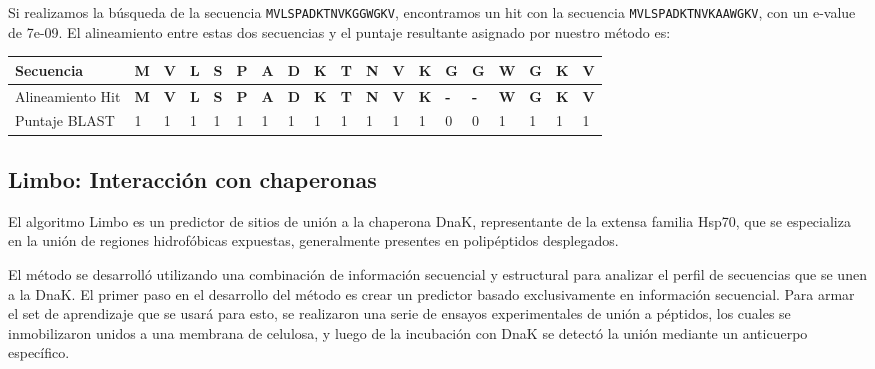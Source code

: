 Si realizamos la búsqueda de la secuencia \texttt{MVLSPADKTNVKGGWGKV}, encontramos un hit con la secuencia \texttt{MVLSPADKTNVKAAWGKV}, con un e-value de 7e-09. 
El alineamiento entre estas dos secuencias y el puntaje resultante asignado por nuestro método es:
\vspace{0.5cm}

\noindent
\begin{tabular}{lllllllllllllllllll} 
\hline
Secuencia 		& \textbf{M} & \textbf{V} & \textbf{L} & \textbf{S} & \textbf{P} & \textbf{A} & \textbf{D} & \textbf{K} & \textbf{T} & \textbf{N} & \textbf{V} & \textbf{K} & \textbf{G} & \textbf{G} & \textbf{W} & \textbf{G} & \textbf{K} & \textbf{V}\\ \hline
Alineamiento Hit	& \textbf{M} & \textbf{V} & \textbf{L} & \textbf{S} & \textbf{P} & \textbf{A} & \textbf{D} & \textbf{K} & \textbf{T} & \textbf{N} & \textbf{V} & \textbf{K} & \textbf{-} & \textbf{-} & \textbf{W} & \textbf{G} & \textbf{K} & \textbf{V}\\ \hline
Puntaje BLAST 		& 1 & 1 & 1 & 1 & 1 & 1 & 1 & 1 & 1 & 1 & 1 & 1 & 0 & 0 & 1 & 1 & 1 & 1 \\ \hline
\end{tabular}




















\subsection{Limbo: Interacción con chaperonas} \label{limbo}
El algoritmo Limbo\cite{van2009accurate} es un predictor de sitios de unión a la chaperona DnaK, representante de la extensa familia Hsp70, que se especializa en la unión de regiones hidrofóbicas expuestas, generalmente
presentes en polipéptidos desplegados. 

El método se desarrolló utilizando una combinación de información secuencial y estructural para analizar el perfil de secuencias que se unen a la DnaK.
El primer paso en el desarrollo del método es crear un predictor basado exclusivamente en información secuencial.
Para armar el set de aprendizaje que se usará para esto, se realizaron una serie de ensayos experimentales de unión a péptidos, los cuales se inmobilizaron unidos a una membrana de celulosa, 
y luego de la incubación con DnaK se detectó la unión mediante un anticuerpo específico.

